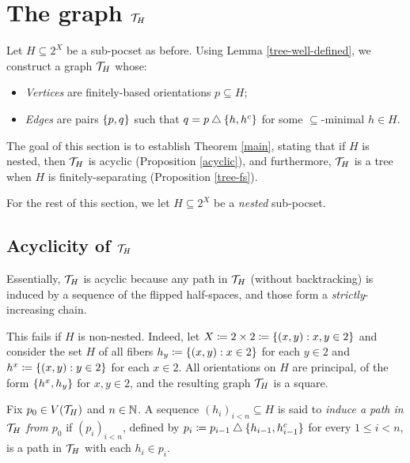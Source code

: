 \documentclass{amsart}
\begin{document}
    \section{The graph $\mathcal{T}_H$}

    Let $H\subseteq2^X$ be a sub-pocset as before. Using Lemma \ref{tree-well-defined}, we construct a graph $\mathcal{T}_H$ whose:
    \begin{itemize}
        \item \textit{Vertices} are finitely-based orientations $p\subseteq H$;
        \item \textit{Edges} are pairs $\left\{p,q\right\}$ such that $q=p\bigtriangleup\left\{h,h^c\right\}$ for some $\subseteq$-minimal $h\in H$.
    \end{itemize}

    The goal of this section is to establish Theorem \ref{main}, stating that if $H$ is nested, then $\mathcal{T}_H$ is acyclic (Proposition \ref{acyclic}), and furthermore, $\mathcal{T}_H$ is a tree when $H$ is finitely-separating (Proposition \ref{tree-fs}).

    For the rest of this section, we let $H\subseteq2^X$ be a \textit{nested} sub-pocset.

    \subsection{Acyclicity of $\mathcal{T}_H$}

    Essentially, $\mathcal{T}_H$ is acyclic because any path in $\mathcal{T}_H$ (without backtracking) is induced by a sequence of the flipped half-spaces, and those form a \textit{strictly}-increasing chain.

    \begin{example}
        This fails if $H$ is non-nested. Indeed, let $X\coloneqq2\times2\coloneqq\left\{(x,y): x,y\in2\right\}$ and consider the set $H$ of all fibers $h_y\coloneqq\left\{(x,y): x\in2\right\}$ for each $y\in2$ and $h^x\coloneqq\left\{(x,y): y\in2\right\}$ for each $x\in2$. All orientations on $H$ are principal, of the form $\left\{h^x,h_y\right\}$ for $x,y\in2$, and the resulting graph $\mathcal{T}_H$ is a square.
    \end{example}

    \begin{definition}
        Fix $p_0\in V(\mathcal{T}_H)$ and $n\in\mathbb{N}$. A sequence $(h_i)_{i<n}\subseteq H$ is said to \textit{induce a path in $\mathcal{T}_H$ from $p_0$} if $(p_i)_{i<n}$, defined by $p_i\coloneqq p_{i-1}\bigtriangleup\{h_{i-1},h_{i-1}^c\}$ for every $1\leq i<n$, is a path in $\mathcal{T}_H$ with each $h_i\in p_i$.
    \end{definition}
\end{document}
